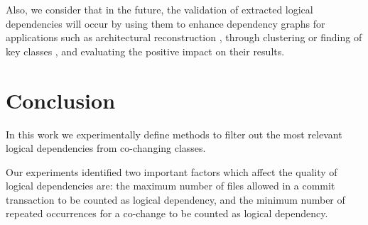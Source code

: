 \documentclass[conference]{IEEEtran}
\begin{document}
Also, we consider that in the future, the validation of extracted logical dependencies will occur by using them to enhance dependency graphs for applications such as architectural reconstruction \cite{Shtern:2012:CMS:2332427.2332428}, \cite{sar}  through clustering \cite{SoraConti} or finding of key classes \cite{PagerankENASE}, and evaluating the positive impact on their results.


\section{Conclusion}
\label{sec:conclusion}
In this work we experimentally define methods to filter out the most relevant logical dependencies from co-changing classes. 

Our experiments identified two important factors which affect the quality of logical dependencies are: the maximum number of files allowed in a commit transaction to be counted as logical dependency, and the minimum number of repeated occurrences for a co-change to be counted as logical dependency.




\end{document}
